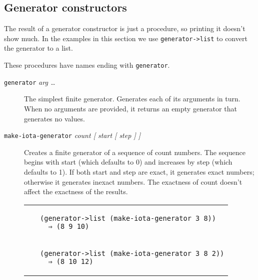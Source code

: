 \subsection{Generator constructors}\label{generator-constructors}

The result of a generator constructor is just a procedure, so printing
it doesn't show much. In the examples in this section we use
\texttt{generator-\textgreater{}list} to convert the generator to a
list.

These procedures have names ending with \texttt{generator}.

\begin{description}
\item[\texttt{generator} \emph{arg \ldots{}}]
The simplest finite generator. Generates each of its arguments in turn.
When no arguments are provided, it returns an empty generator that
generates no values.
\end{description}

\begin{description}
\item[\texttt{make-iota-generator} \emph{count {[} start {[} step {]}
{]}}]
Creates a finite generator of a sequence of count numbers. The sequence
begins with start (which defaults to 0) and increases by step (which
defaults to 1). If both start and step are exact, it generates exact
numbers; otherwise it generates inexact numbers. The exactness of count
doesn't affect the exactness of the results.

\begin{longtable}[]{@{}ll@{}}
\toprule
\begin{minipage}[t]{0.47\columnwidth}\raggedright\strut
~\strut
\end{minipage} & \begin{minipage}[t]{0.47\columnwidth}\raggedright\strut
\begin{verbatim}
(generator->list (make-iota-generator 3 8))
  ⇒ (8 9 10)
\end{verbatim}
\strut
\end{minipage}\tabularnewline
\begin{minipage}[t]{0.47\columnwidth}\raggedright\strut
~\strut
\end{minipage} & \begin{minipage}[t]{0.47\columnwidth}\raggedright\strut
\begin{verbatim}
(generator->list (make-iota-generator 3 8 2))
  ⇒ (8 10 12)
\end{verbatim}
\strut
\end{minipage}\tabularnewline
\bottomrule
\end{longtable}
\end{description}

